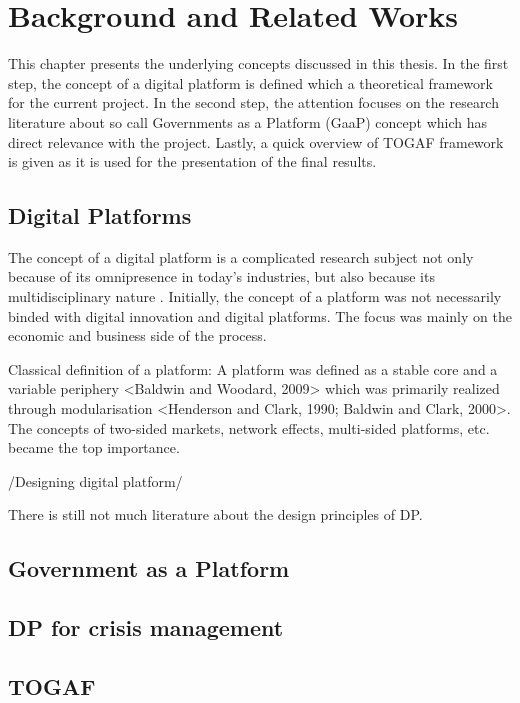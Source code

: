 \setcounter{reaction}{0}%


\chapter{Background and Related Works} \label{chapter2}

This chapter presents the underlying concepts discussed in this thesis. In the first step, the concept of a digital platform is defined which a theoretical framework for the current project. In the second step, the attention focuses on the research literature about so call Governments as a Platform (GaaP) concept which has direct relevance with the project. Lastly, a quick overview of TOGAF framework is given as it is used for the presentation of the final results.

\section{Digital Platforms}
The concept of a digital platform is a complicated research subject not only because of its omnipresence in today's industries, but also because its multidisciplinary nature \citep{deReuver:2018}. Initially, the concept of a platform was not necessarily binded with digital innovation and digital platforms. The focus was mainly on the economic and business side of the process. 

Classical definition of a platform: A platform was defined as a stable core and a variable periphery <Baldwin and Woodard, 2009> which was primarily realized through modularisation <Henderson and Clark, 1990; Baldwin and Clark, 2000>. The concepts of two-sided markets, network effects, multi-sided platforms, etc. became the top importance.

/Designing digital platform/ 

There is still not much literature about the design principles of DP.

\section{Government as a Platform}

\section{DP for crisis management}

\section{TOGAF}

